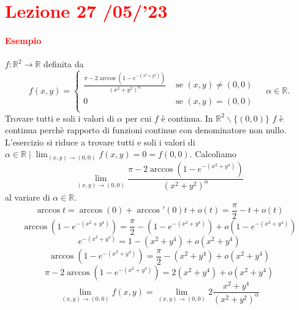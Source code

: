 \documentclass{article}
\newcommand{\R}{\mathbb{R}}
\begin{document}
\newpage
\section{\textcolor{red}{Lezione 27 \space{}/05/'23}}
\paragraph{\textcolor{red}{Esempio}}
$f:\R^2\rightarrow \R$ definita da 
\begin{equation*}
    f(x,y)=\begin{cases}
        \frac{\pi-2\arccos(1-e^{-(x^2+y^4)})}{(x^2+y^2)^\alpha}&\text{  se  }(x,y)\neq (0,0)\\
        0&\text{  se  }(x,y)=(0,0) \\
    \end{cases}\,\,\,\,\,\,\,\alpha \in \R.
\end{equation*}
Trovare tutti e soli i valori di $\alpha$ per cui $f$ è continua. In $\R^2 \backslash\{(0,0)\}$ $f$ è continua perchè rapporto di funzioni continue con denominatore non nullo. L'esercizio si riduce a trovare tutti e soli i valori di $\alpha \in \R \mid \lim_{(x,y)\rightarrow(0,0)}f(x,y)=0=f(0,0)$. Calcoliamo
\begin{equation*}
    \lim_{(x,y)\rightarrow(0,0)}  \frac{\pi-2\arccos(1-e^{-(x^2+y^4)})}{(x^2+y^2)^\alpha}
\end{equation*}
al variare di $\alpha \in \R$.\\
\begin{equation*}
    \arccos t=\arccos(0)+\arccos'(0)t+o(t)=\frac{\pi}{2}-t+o(t)
\end{equation*}
\begin{equation*}
    \arccos(1-e^{-(x^2+y^4)})=\frac{\pi}{2}-(1-e^{-(x^2+y^4)})+o(1-e^{-(x^2+y^4)})
\end{equation*}
\begin{equation*}
    e^{-(x^2+y^4)}=1-(x^2+y^4)+o(x^2+y^4)
\end{equation*}
\begin{equation*}
    \arccos(1-e^{-(x^2+y^4)})=\frac{\pi}{2}-(x^2+y^4)+o(x^2+y^4)
\end{equation*}
\begin{equation*}
    \pi-2\arccos(1-e^{-(x^2+y^4)})=2(x^2+y^4)+o(x^2+y^4) 
\end{equation*}
\begin{equation*}
    \lim_{(x,y)\rightarrow(0,0)}f(x,y)=\lim_{(x,y)\rightarrow(0,0)}2\frac{x^2+y^4}{(x^2+y^2)^\alpha}
\end{equation*}
\end{document}
